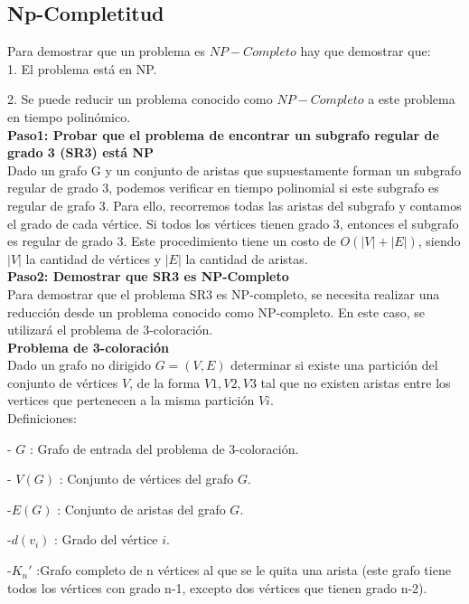 \documentclass[
10pt, %
a4paper, %
oneside, %
headinclude,footinclude, %
BCOR5mm, %
]{scrartcl}
\begin{document}
\subsection{Np-Completitud}

Para demostrar que un problema es $NP-Completo$ hay que demostrar que:\\

1. El problema está en NP.

2. Se puede reducir un problema conocido como $NP-Completo$ a este problema en tiempo polinómico.\\

\textbf{Paso1: Probar que el problema de encontrar un subgrafo regular de grado 3 (SR3) está NP }\\


Dado un grafo G y un conjunto de aristas que supuestamente forman un subgrafo regular de grado 3, podemos verificar en 
tiempo polinomial si este subgrafo es regular de grafo 3. Para ello, recorremos todas las aristas del subgrafo y contamos el grado de
cada vértice. Si todos los vértices tienen grado 3, entonces el subgrafo es regular de grado 3. Este procedimiento tiene un costo de 
$O(|V|+|E|)$, siendo $|V|$ la cantidad de vértices y $|E|$ la cantidad de aristas.\\


\textbf{Paso2: Demostrar que SR3 es NP-Completo}\\

Para demostrar que el problema SR3 es NP-completo, se necesita realizar una reducción desde un problema conocido como NP-completo. 
En este caso, se utilizará el problema de 3-coloración.\\


\textbf{ Problema de 3-coloración} \\


Dado un grafo no dirigido $G = (V,E)$ determinar si existe una partición del conjunto de vértices $V$,
de la forma ${V1,V2,V3}$ tal que no existen aristas entre los vertices que pertenecen a la misma partición $Vi$.\\


Definiciones:

- $G$ : Grafo de entrada del problema de 3-coloración.

- $V(G)$ : Conjunto de vértices del grafo $G$.

-$E(G)$ : Conjunto de aristas del grafo $G$. 

-$d(v_i)$ : Grado del vértice $i$.

-$K_n'$ :Grafo completo de n vértices al que se le quita una arista (este grafo tiene todos los vértices con grado n-1, excepto dos vértices que tienen grado n-2).
\end{document}
